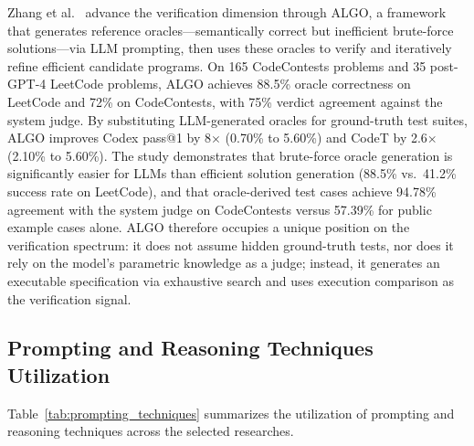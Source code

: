 \documentclass[10pt,a4paper]{article}
\begin{document}
Zhang et al.~\cite{zhang2023algo} advance the verification dimension through ALGO, a framework that generates reference oracles---semantically correct but inefficient brute-force solutions---via LLM prompting, then uses these oracles to verify and iteratively refine efficient candidate programs. On 165 CodeContests problems and 35 post-GPT-4 LeetCode problems, ALGO achieves 88.5\% oracle correctness on LeetCode and 72\% on CodeContests, with 75\% verdict agreement against the system judge. By substituting LLM-generated oracles for ground-truth test suites, ALGO improves Codex pass@1 by 8$\times$ (0.70\% to 5.60\%) and CodeT by 2.6$\times$ (2.10\% to 5.60\%). The study demonstrates that brute-force oracle generation is significantly easier for LLMs than efficient solution generation (88.5\% vs.\ 41.2\% success rate on LeetCode), and that oracle-derived test cases achieve 94.78\% agreement with the system judge on CodeContests versus 57.39\% for public example cases alone. ALGO therefore occupies a unique position on the verification spectrum: it does not assume hidden ground-truth tests, nor does it rely on the model's parametric knowledge as a judge; instead, it generates an executable specification via exhaustive search and uses execution comparison as the verification signal.

\subsection{Prompting and Reasoning Techniques Utilization}
\label{sec:prompting_results}
Table~\ref{tab:prompting_techniques} summarizes the utilization of prompting and reasoning techniques across the selected researches.
\end{document}

